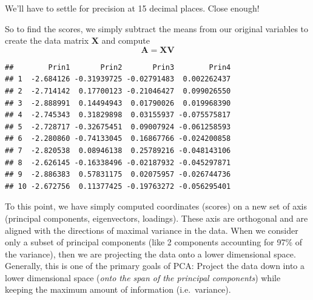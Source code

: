\documentclass[
]{article}
\newenvironment{Shaded}{\begin{snugshade}}{\end{snugshade}}
\newcommand{\AttributeTok}[1]{\textcolor[rgb]{0.77,0.63,0.00}{#1}}
\newcommand{\CommentTok}[1]{\textcolor[rgb]{0.56,0.35,0.01}{\textit{#1}}}
\newcommand{\ConstantTok}[1]{\textcolor[rgb]{0.00,0.00,0.00}{#1}}
\newcommand{\DecValTok}[1]{\textcolor[rgb]{0.00,0.00,0.81}{#1}}
\newcommand{\FunctionTok}[1]{\textcolor[rgb]{0.00,0.00,0.00}{#1}}
\newcommand{\NormalTok}[1]{#1}
\newcommand{\OtherTok}[1]{\textcolor[rgb]{0.56,0.35,0.01}{#1}}
\newcommand{\SpecialCharTok}[1]{\textcolor[rgb]{0.00,0.00,0.00}{#1}}
\newcommand{\StringTok}[1]{\textcolor[rgb]{0.31,0.60,0.02}{#1}}
\theoremstyle{definition}
\theoremstyle{definition}
\theoremstyle{definition}
\theoremstyle{definition}
\theoremstyle{remark}
\begin{document}
We'll have to settle for precision at 15 decimal places. Close enough!

So to find the scores, we simply subtract the means from our original variables to create the data matrix \(\mathbf{X}\) and compute
\[\mathbf{A}=\mathbf{X}\mathbf{V}\]

\begin{Shaded}
\end{Shaded}

\begin{verbatim}
##        Prin1       Prin2       Prin3        Prin4
## 1  -2.684126 -0.31939725 -0.02791483  0.002262437
## 2  -2.714142  0.17700123 -0.21046427  0.099026550
## 3  -2.888991  0.14494943  0.01790026  0.019968390
## 4  -2.745343  0.31829898  0.03155937 -0.075575817
## 5  -2.728717 -0.32675451  0.09007924 -0.061258593
## 6  -2.280860 -0.74133045  0.16867766 -0.024200858
## 7  -2.820538  0.08946138  0.25789216 -0.048143106
## 8  -2.626145 -0.16338496 -0.02187932 -0.045297871
## 9  -2.886383  0.57831175  0.02075957 -0.026744736
## 10 -2.672756  0.11377425 -0.19763272 -0.056295401
\end{verbatim}

To this point, we have simply computed coordinates (scores) on a new set of axis (principal components, eigenvectors, loadings). These axis are orthogonal and are aligned with the directions of maximal variance in the data. When we consider only a subset of principal components (like 2 components accounting for 97\% of the variance), then we are projecting the data onto a lower dimensional space. Generally, this is one of the primary goals of PCA: Project the data down into a lower dimensional space (\emph{onto the span of the principal components}) while keeping the maximum amount of information (i.e.~variance).
\end{document}
